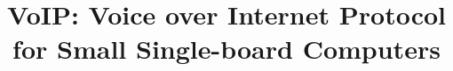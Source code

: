 \documentclass[conference]{IEEEtran}
\begin{document}
	
	
	
	\title{VoIP: Voice over Internet Protocol for Small Single-board Computers}
	
	
	\maketitle
	\thispagestyle{plain}
	\pagestyle{plain}
	
	
	
	
	
	
	

	
	
	
	
	
	
	
		
	
	
	
	
	
	
	\appendices
	
	
	

	
\end{document}
